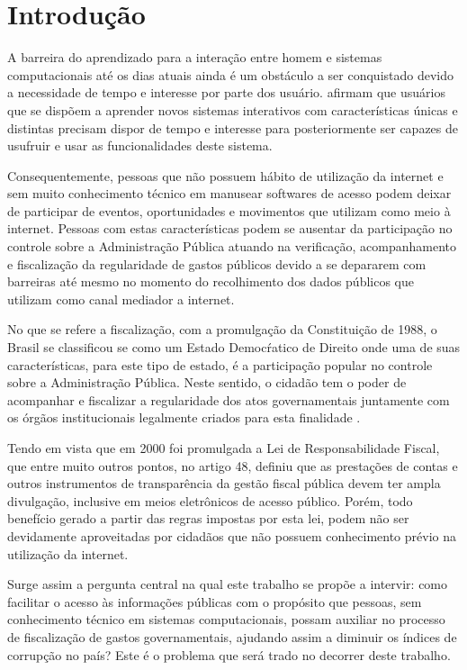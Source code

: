 \chapter{Introdução}
A barreira do aprendizado para a interação entre homem e sistemas computacionais até os dias atuais ainda é um obstáculo a ser conquistado devido a necessidade de tempo e interesse por parte dos usuário. \cite{Barbosa:2010} afirmam que usuários que se dispõem a aprender novos sistemas interativos com características únicas e distintas precisam dispor de tempo e interesse para posteriormente ser capazes de usufruir e usar as funcionalidades deste sistema.

Consequentemente, pessoas que não possuem hábito de utilização da internet e sem muito conhecimento técnico em manusear softwares de acesso podem deixar de participar de eventos, oportunidades e movimentos que utilizam como meio à internet. Pessoas com estas características podem se ausentar da participação no controle sobre a Administração Pública atuando na verificação, acompanhamento e fiscalização da regularidade de gastos públicos devido a se depararem com barreiras até mesmo no momento do recolhimento dos dados públicos que utilizam como canal mediador a internet.

No que se refere a fiscalização, com a promulgação da Constituição de 1988, o Brasil se classificou se como um Estado Democŕatico de Direito onde uma de suas características, para este tipo de estado, é a participação popular no controle sobre a Administração Pública. Neste sentido, o cidadão tem o poder de acompanhar e fiscalizar a regularidade dos atos governamentais juntamente com os órgãos institucionais legalmente criados para esta finalidade \cite{Arruda:2010}.

Tendo em vista que em 2000 foi promulgada a Lei de Responsabilidade Fiscal, que entre muito outros pontos, no artigo 48, definiu que as prestações de contas e outros instrumentos de transparência da gestão fiscal pública devem ter ampla divulgação, inclusive em meios eletrônicos de acesso público. Porém, todo benefício gerado a partir das regras impostas por esta lei, podem não ser devidamente aproveitadas por cidadãos que não possuem conhecimento prévio na utilização da internet.

Surge assim a pergunta central na qual este trabalho se propõe a intervir: como facilitar o acesso às informações públicas com o propósito que pessoas, sem conhecimento técnico em sistemas computacionais, possam auxiliar no processo de fiscalização de gastos governamentais, ajudando assim a diminuir os índices de corrupção no país? Este é o problema que será trado no decorrer deste trabalho.

